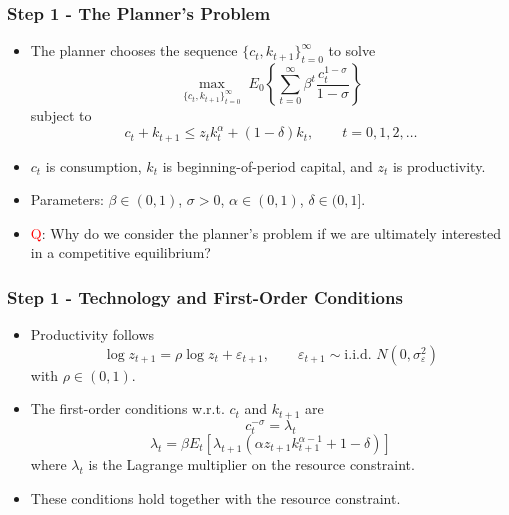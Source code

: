 \documentclass{beamer}
\begin{document}
\begin{frame}
\frametitle{Step 1 - The Planner's Problem}

\begin{itemize}	
\item The planner chooses the sequence $\{c_t,k_{t+1}\}_{t=0}^{\infty}$ to solve
\begin{equation*}
\max_{\{c_t,k_{t+1}\}_{t=0}^{\infty}}
\;
E_0\left\{\sum_{t=0}^{\infty}\beta^t \frac{c_t^{1-\sigma}}{1-\sigma}\right\}
\end{equation*}
subject to
\begin{equation*}
c_t + k_{t+1} \le z_t k_t^\alpha + (1-\delta)k_t,
\qquad t=0,1,2,\dots
\end{equation*}
\item $c_t$ is consumption, $k_t$ is beginning-of-period capital, and $z_t$ is productivity.
\item Parameters: $\beta \in (0,1)$, $\sigma > 0$, $\alpha \in (0,1)$, $\delta \in (0,1]$.
\pause 
\item \textcolor{red}{Q}: Why do we consider the planner's problem if we are ultimately interested in a competitive equilibrium?
\end{itemize}

\end{frame}

\begin{frame}
\hypertarget{euler-main}{}
\frametitle{Step 1 - Technology and First-Order Conditions}

\begin{itemize}
\item Productivity follows
\begin{equation*}
\log z_{t+1} = \rho \log z_t + \varepsilon_{t+1},
\qquad
\varepsilon_{t+1} \sim \text{i.i.d. } N(0,\sigma_\varepsilon^2)
\end{equation*}
with $\rho \in (0,1)$.
\item The first-order conditions w.r.t. $c_t$ and $k_{t+1}$ are
\begin{equation*}
c_t^{-\sigma} = \lambda_t
\end{equation*}
\begin{equation*}
\lambda_t = \beta E_t\left[
\lambda_{t+1}\left(\alpha z_{t+1}k_{t+1}^{\alpha-1} + 1-\delta\right)
\right]
\end{equation*}
where $\lambda_t$ is the Lagrange multiplier on the resource constraint.
\hyperlink{euler-derivation}{}
\item These conditions hold together with the resource constraint.
\end{itemize}

\end{frame}
\end{document}
